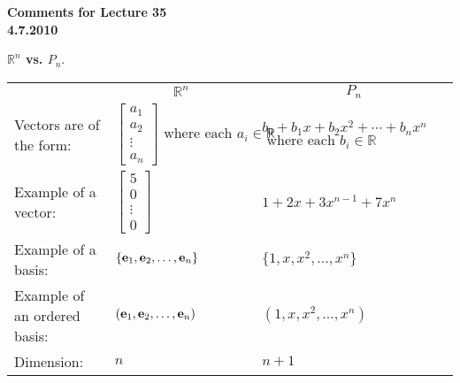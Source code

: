 \documentclass[12pt]{article}
\begin{document}
\begin{center}
{\large \bf Comments for Lecture 35}\\
\bf{4.7.2010}
\end{center}

\begin{center}{\LARGE \bf $\mathbb{R}^n$ vs. $P_n$}.\end{center}


\begin{tabular}{p{4cm}|p{5cm}|p{6cm}|}
\multicolumn{1}{r}{}
 &  \multicolumn{1}{c}{$\mathbb{R}^n$}
 & \multicolumn{1}{c}{$P_n$} \\
\cmidrule{2-3}
Vectors are of the form: & \rule{0cm}{1cm} $\left[ \begin{array}{c} a_1  \\ a_2 \\ \vdots \\ a_n  \end{array} \right] \text{ where each } a_i\in \mathbb{R} $ & $b_0 + b_1 x + b_2 x^2 + \cdots + b_n x^n$ $\text{ where each } b_i\in \mathbb{R} $\\
\cmidrule{2-3}
Example of a vector: &  \rule{0cm}{1cm} $\left[ \begin{array}{c} 5  \\ 0 \\ \vdots \\ 0  \end{array} \right]$ & $1 + 2 x +3x^{n-1}+7x^n$\\
\cmidrule{2-3}
Example of a basis: & $\{ {\bf e}_1 , {\bf e}_2 , \ldots , {\bf e}_n \}$ & $\{ 1 , x , x^2 ,  \ldots , x^n \}$ \\
\cmidrule{2-3}
Example of an ordered basis: & $( {\bf e}_1 , {\bf e}_2 , \ldots , {\bf e}_n )$ & $( 1 , x , x^2 ,  \ldots , x^n )$ \\
\cmidrule{2-3}
Dimension: & $n$ & $n+1$ \\

\cmidrule{2-3}
\end{tabular}





\end{document}
